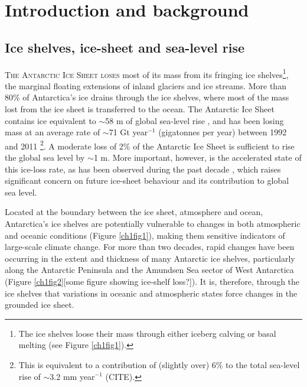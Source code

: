 


\chapter{Introduction and background}

\section*{Ice shelves, ice-sheet and sea-level rise}

\lettrine[lines=2]{T}{he Antarctic Ice Sheet loses} most of its mass from its fringing ice shelves\footnote{
The ice shelves loose their mass through either iceberg calving or basal melting
(see Figure \ref{ch1fig1}).},
the marginal floating extensions of inland glaciers and ice streams. More than 80\% of
Antarctica's ice drains through the ice shelves, where most of the mass
lost from the ice sheet is transferred to the ocean. The Antarctic Ice Sheet
contains ice equivalent to $\sim$58 m of global sea-level rise
\parencite{Fretwell2013}, and has been losing mass at an average rate of
$\sim$71 Gt year$^{-1}$ (gigatonnes per year) between 1992 and 2011
\parencite{Shepherd2012}\footnote{This is equivalent to a contribution of
(slightly over) 6\% to the total sea-level rise of $\sim$3.2 mm year$^{-1}$
(CITE).}. A moderate loss of 2\% of the Antarctic Ice Sheet is sufficient to rise
the global sea level by $\sim$1 m. More important, however, is the accelerated
state of this ice-loss rate, as has been observed during the past decade
\parencite{Shepherd2012, Sutterley2014, Velicogna2009, Chen2009, Harig2015}, 
which raises significant concern on future ice-sheet behaviour and its
contribution to global sea level. 

Located at the boundary between the ice sheet, atmosphere and ocean,
Antarctica's ice shelves are potentially vulnerable to changes in both
atmospheric and oceanic conditions (Figure \ref{ch1fig1}), making them sensitive indicators of
large-scale climate change. For more than two decades, rapid
changes have been occurring in the extent and thickness of many Antarctic ice
shelves, particularly along the Antarctic Peninsula and the Amundsen Sea
sector of West Antarctica \parencite{Cook2010, Pritchard2012, Shepherd2010,
Wingham2009, Zwally2005, Fricker2012}(Figure \ref{ch1fig2}[some figure
showing ice-shelf loss?]). It is, therefore, through the ice shelves that variations in
oceanic and atmospheric states force changes in the grounded ice sheet.

